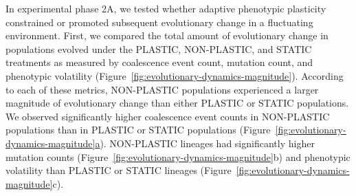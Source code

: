 \documentclass[utf8]{frontiersSCNS} %
\begin{document}
\begin{raggedbottom}
%
%
%
%

In experimental phase 2A,
we tested whether adaptive phenotypic plasticity constrained or promoted subsequent evolutionary change in a fluctuating environment.
First, we compared the total amount of evolutionary change in populations evolved under the PLASTIC, NON-PLASTIC, and STATIC treatments as measured by coalescence event count, mutation count, and phenotypic volatility (Figure~\ref{fig:evolutionary-dynamics-magnitude}).
According to each of these metrics, NON-PLASTIC populations experienced a larger magnitude of evolutionary change than either PLASTIC or STATIC populations.
We observed significantly higher coalescence event counts in NON-PLASTIC populations than in PLASTIC or STATIC populations (Figure~\ref{fig:evolutionary-dynamics-magnitude}\hyperref[fig:evolutionary-dynamics-magnitude]{a}).
NON-PLASTIC lineages had significantly higher mutation counts (Figure~\ref{fig:evolutionary-dynamics-magnitude}b) and phenotypic volatility than PLASTIC or STATIC lineages (Figure~\ref{fig:evolutionary-dynamics-magnitude}c).


\end{raggedbottom}
\end{document}
